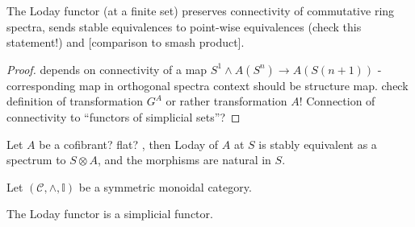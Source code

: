   \begin{lem}\label{lem_loday_functor_preserves_connectivity}
    The Loday functor (at a finite set) preserves connectivity of commutative
    ring spectra, sends stable equivalences to point-wise equivalences (check
    this statement!) and [comparison to smash product].
    \begin{proof}
      depends on connectivity of a map $S^1 \wedge A(S^n) \to A(S(n+1))$ -
      corresponding map in orthogonal spectra context should be structure map.
      check definition of transformation $G^A$ or rather transformation $A$!
      Connection of connectivity to ``functors of simplicial sets''?
    \end{proof}
  \end{lem}
  \begin{cor}\label{cor_loday_at_S_naturally_equivalent_to_tensor_with_S}
    Let $A$ be a cofibrant? flat? \hring, then Loday of $A$ at $S$ is stably
    equivalent as a spectrum to $S \otimes A$, and the morphisms are natural in
    $S$.
  \end{cor}
  \begin{defn}\label{def_loday_functor_in_symmetric_monoidal_category} 
    Let $(\mathcal{C},\wedge, \mathbb{I})$ be a symmetric monoidal category.\\
  \end{defn}
  \begin{lem}\label{lem_loday_functor_is_simplicial}
    The Loday functor is a simplicial functor.\\
  \end{lem}
